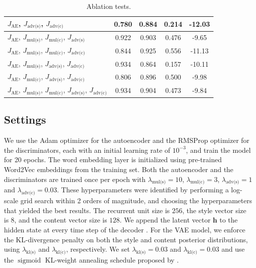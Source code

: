 \documentclass[letterpaper]{article} %
\newcommand{\loss}[1]{J_{\text{#1}}}
\newcommand{\hyp}[1]{\lambda_{\text{#1}}}
\newcommand{\citeay}[1]{\citeauthor{#1} \shortcite{#1}}
\begin{document}
\begin{table}[ht]
\begin{tabular}{| l || c | c | c | c |}
		\hline
		$\loss{AE}$, $\loss{adv(s)}$, $\loss{adv(c)}$                                   & 0.780           & 0.884             & 0.214          & -12.03          \\
		\hline
		$\loss{AE}$, $\loss{mul(s)}$, $\loss{mul(c)}$, $\loss{adv(s)}$                  & 0.922           & 0.903             & 0.476          & -9.65           \\
		\hline
		$\loss{AE}$, $\loss{mul(s)}$, $\loss{mul(c)}$, $\loss{adv(c)}$                  & 0.844           & 0.925             & 0.556          & -11.13          \\
		\hline
		$\loss{AE}$, $\loss{mul(s)}$, $\loss{adv(s)}$, $\loss{adv(c)}$                  & 0.934           & 0.864             & 0.157          & -10.11          \\
		\hline
		$\loss{AE}$, $\loss{mul(c)}$, $\loss{adv(s)}$, $\loss{adv(c)}$                  & 0.806           & 0.896             & 0.500          & -9.98           \\
		\hline
		$\loss{AE}$, $\loss{mul(s)}$, $\loss{mul(c)}$, $\loss{adv(s)}$, $\loss{adv(c)}$ & 0.934           & 0.904             & 0.473          & -9.84           \\
		\hline
	\end{tabular}
	\caption{Ablation tests.}
	\label{tab:ablation-results}
\end{table}

\subsection{Settings}
We use the Adam optimizer \cite{kingma2014adam} for the autoencoder and the RMSProp optimizer \cite{tieleman2012lecture} for the discriminators, each with an initial learning rate of $10^{-3}$, and train the model for 20 epochs.
The word embedding layer is initialized using pre-trained Word2Vec embeddings \cite{mikolov2013distributed} from the training set.
Both the autoencoder and the discriminators are trained once per epoch with $\hyp{mul(s)} = 10$, $\hyp{mul(c)} = 3$, $\hyp{adv(s)} = 1$ and $\hyp{adv(c)} = 0.03$.
These hyperparameters were identified by performing a log-scale grid search within 2 orders of magnitude, and choosing the hyperparameters that yielded the best results.
The recurrent unit size is $256$, the style vector size is $8$, and the content vector size is $128$.
We append the latent vector $\bm h$ to the hidden state at every time step of the decoder \cite{bahuleyan2017variational}.
For the VAE model, we enforce the KL-divergence penalty on both the style and content posterior distributions, using $\hyp{kl(s)}$ and $\hyp{kl(c)}$, respectively.
We set $\hyp{kl(s)} = 0.03$ and $\hyp{kl(c)} = 0.03$ and use the $\operatorname{sigmoid}$ KL-weight annealing schedule proposed by \citeay{bahuleyan2018probabilistic}.
\end{document}

